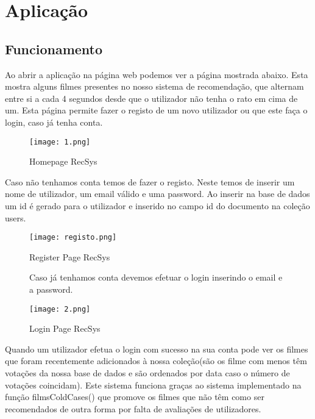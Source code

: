\section{Aplicação}


\subsection{Funcionamento}

Ao abrir a aplicação na página web podemos ver a página mostrada abaixo. Esta mostra alguns filmes presentes no nosso sistema de recomendação, que alternam entre si a cada 4 segundos desde que o utilizador não tenha o rato em cima de um. Esta página permite fazer o registo de um novo utilizador ou que este faça o login, caso já tenha conta.\newline

\begin{figure}[H]
\centering
\texttt{[image: 1.png]}
\caption {Homepage RecSys}
\label {fig07}
\end{figure}

Caso não tenhamos conta temos de fazer o registo. Neste temos de inserir um nome de utilizador, um email válido e uma password.  Ao inserir na base de dados um id é gerado para o utilizador e inserido no campo id do documento na coleção users.\newline

\begin{figure}[H]
\centering
\texttt{[image: registo.png]}
\caption {Register Page RecSys}
\label {fig08}
\end{figure}

\begin{figure}[H]
Caso já tenhamos conta devemos efetuar o login inserindo o email e a password.\newline

\centering
\texttt{[image: 2.png]}
\caption {Login Page RecSys}
\label {fig09}
\end{figure}

Quando um utilizador efetua o login com sucesso na sua conta pode ver os filmes que foram recentemente adicionados à nossa coleção(são os filme com menos têm votações da nossa base de dados e são ordenados por data caso o número de votações coincidam). Este sistema funciona graças ao sistema implementado na função filmsColdCases() que promove os filmes que não têm como ser recomendados de outra forma por falta de avaliações de utilizadores.\newline



